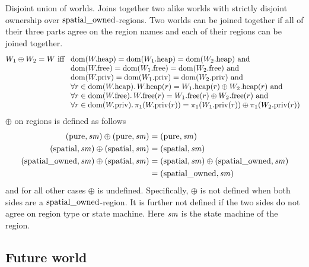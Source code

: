 \documentclass[a4paper]{article}
\begin{document}
Disjoint union of worlds. Joins together two alike worlds with strictly disjoint ownership over $\spatialo$-regions. Two worlds can be joined together if all of their three parts agree on the region names and each of their regions can be joined together.
\[
  W_1 \oplus W_2 = W
  \text{ iff }
  \begin{array}[t]{l}
    \text{$\dom(\pwheap) = \dom(\pwheap[W_1]) = \dom(\pwheap[W_2]) \tand$} \\
    \text{$\dom(\pwfree) = \dom(\pwfree[W_1]) = \dom(\pwfree[W_2]) \tand$} \\
    \text{$\dom(\pwpriv) = \dom(\pwpriv[W_1]) = \dom(\pwpriv[W_2]) \tand$} \\
    \forall r \in \dom(\pwheap) \ldotp \pwheap(r) = \pwheap[W_1](r) \oplus \pwheap[W_2](r) \tand \\
    \forall r \in \dom(\pwfree) \ldotp \pwfree(r) = \pwfree[W_1](r) \oplus \pwfree[W_2](r) \tand \\
    \forall r \in \dom(\pwpriv) \ldotp \pi_1(\pwpriv(r)) = \pi_1(\pwpriv[W_1](r)) \oplus \pi_1(\pwpriv[W_2](r))
  \end{array}
\]
$\oplus$ on regions is defined as follows
\begin{align*}
  (\pure,\var{sm}) \oplus (\pure,\var{sm}) =  & \; (\pure,\var{sm}) \\
  (\spatial,\var{sm}) \oplus (\spatial,\var{sm}) =  & \; (\spatial,\var{sm}) \\
  (\spatialo,\var{sm}) \oplus (\spatial,\var{sm}) = & \; (\spatial,\var{sm}) \oplus (\spatialo,\var{sm})\\
                                           =  & \; (\spatialo,\var{sm})
\end{align*}
and for all other cases $\oplus$ is undefined. Specifically, $\oplus$ is not defined when both sides are a $\spatialo$-region. It is further not defined if the two sides do not agree on region type or state machine. Here $\var{sm}$ is the state machine of the region.

\subsection{Future world}
\end{document}

